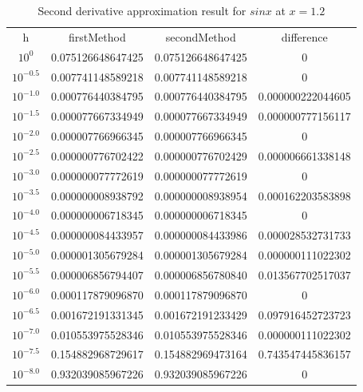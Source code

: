 \documentclass{article}
\begin{document}
  \begin{longtable}{c|c|c|c}
	\caption{Second derivative approximation result for $sinx$ at $x=1.2$} \\
  \hline\hline
	  h & firstMethod & secondMethod & difference \\ [0.5ex]
  
$10^{0}$ & 0.075126648647425 & 0.075126648647425 & 0 \\
$10^{-0.5}$ & 0.007741148589218 & 0.007741148589218 & 0 \\
$10^{-1.0}$ & 0.000776440384795 & 0.000776440384795 & 0.000000222044605 \\
$10^{-1.5}$ & 0.000077667334949 & 0.000077667334949 & 0.000000777156117 \\
$10^{-2.0}$ & 0.000007766966345 & 0.000007766966345 & 0                 \\
$10^{-2.5}$ & 0.000000776702422 & 0.000000776702429 & 0.000006661338148 \\
$10^{-3.0}$ & 0.000000077772619 & 0.000000077772619 & 0                 \\
$10^{-3.5}$ & 0.000000008938792 & 0.000000008938954 & 0.000162203583898 \\
$10^{-4.0}$ & 0.000000006718345 & 0.000000006718345 & 0                 \\
$10^{-4.5}$ & 0.000000084433957 & 0.000000084433986 & 0.000028532731733 \\
$10^{-5.0}$ & 0.000001305679284 & 0.000001305679284 & 0.000000111022302 \\
$10^{-5.5}$ & 0.000006856794407 & 0.000006856780840 & 0.013567702517037 \\
$10^{-6.0}$ & 0.000117879096870 & 0.000117879096870 & 0                 \\
$10^{-6.5}$ & 0.001672191331345 & 0.001672191233429 & 0.097916452723723 \\
$10^{-7.0}$ & 0.010553975528346 & 0.010553975528346 & 0.000000111022302 \\
$10^{-7.5}$ & 0.154882968729617 & 0.154882969473164 & 0.743547445836157 \\
$10^{-8.0}$ & 0.932039085967226 & 0.932039085967226 & 0 \\ [1ex]
	  
	  
   \hline

  \end{longtable}
	  
\end{document}
